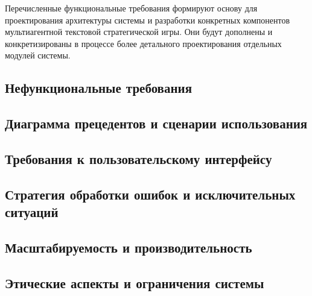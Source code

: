 Перечисленные функциональные требования формируют основу для проектирования архитектуры системы и разработки конкретных компонентов мультиагентной текстовой стратегической игры. Они будут дополнены и конкретизированы в процессе более детального проектирования отдельных модулей системы.

\subsection{Нефункциональные требования}

\subsection{Диаграмма прецедентов и сценарии использования}

\subsection{Требования к пользовательскому интерфейсу}

\subsection{Стратегия обработки ошибок и исключительных ситуаций}

\subsection{Масштабируемость и производительность}

\subsection{Этические аспекты и ограничения системы}